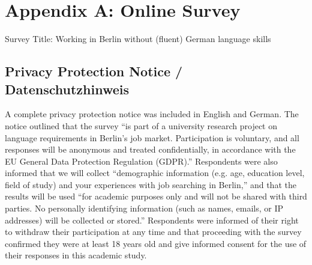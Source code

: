 \section{Appendix A: Online Survey}

\noindent Survey Title: Working in Berlin without (fluent) German language skills

\subsection*{Privacy Protection Notice / Datenschutzhinweis}

A complete privacy protection notice was included in English and German. The notice outlined that the survey “is part of a university research project on language requirements in Berlin’s job market. Participation is voluntary, and all responses will be anonymous and treated confidentially, in accordance with the EU General Data Protection Regulation (GDPR).” Respondents were also informed that we will collect “demographic information (e.g. age, education level, field of study) and your experiences with job searching in Berlin,” and that the results will be used “for academic purposes only and will not be shared with third parties. No personally identifying information (such as names, emails, or IP addresses) will be collected or stored.” Respondents were informed of their right to withdraw their participation at any time and that proceeding with the survey confirmed they were at least 18 years old and give informed consent for the use of their responses in this academic study.

